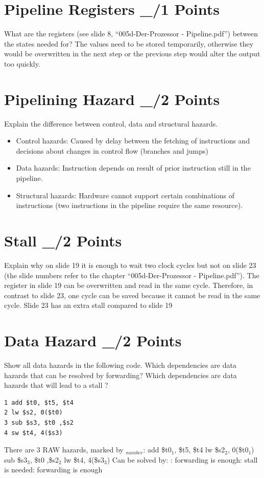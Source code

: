 \documentclass{article}
\begin{document}
\section{Pipeline Registers \_/1 Points}
What are the registers (see slide 8, “005d-Der-Prozessor - Pipeline.pdf”) between the states needed
for?
The values need to be stored temporarily, otherwise they would be overwritten in the next step or the 
previous step would alter the output too quickly.

\section{Pipelining Hazard \_/2 Points}
Explain the difference between control, data and structural hazards.
\begin{itemize}
    \item Control hazards: Caused by delay between the fetching of instructions and decisions about 
    changes in control flow (branches and jumps)
    \item Data hazards: Instruction depends on result of prior instruction still in the pipeline.
    \item Structural hazards: Hardware cannot support certain combinations of instructions 
    (two instructions in the pipeline require the same resource).
\end{itemize}
\section{Stall \_/2 Points}
Explain why on slide 19 it is enough to wait two clock cycles but not on slide 23 (the slide numbers
refer to the chapter “005d-Der-Prozessor - Pipeline.pdf”).\newline
The register in slide 19 can be overwritten and read in the same cycle. Therefore, in contrast 
to slide 23, one cycle can be saved because it cannot be read in the same cycle.
\rightarrow Slide 23 has an extra stall compared to slide 19
\section{Data Hazard \_/2 Points}
Show all data hazards in the following code. Which dependencies are data hazards that can be
resolved by forwarding? Which dependencies are data hazards that will lead to a stall ?
\begin{verbatim}
1 add $t0, $t5, $t4
2 lw $s2, 0($t0)
3 sub $s3, $t0 ,$s2
4 sw $t4, 4($s3)
\end{verbatim}
There are 3 RAW hazards, marked by $_{number}$: add \$t0$_1$, \$t5, \$t4  lw \$s2$_2$, 0(\$t0$_1$)  sub \$s3$_3$, \$t0 ,\$s2$_2$  lw \$t4, 4(\$s3$_3$) \newline
Can be solved by: : forwarding is enough: stall is needed: forwarding is enough\newline
\end{document}
